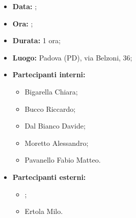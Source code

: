 \begin{itemize}
	\item \textbf{Data:} ;
	\item \textbf{Ora:} ;
	\item \textbf{Durata:} 1 ora;
	\item \textbf{Luogo:} Padova (PD), via Belzoni, 36;
	\item \textbf{Partecipanti interni:}
	\begin{itemize}
		\item Bigarella Chiara;
		\item Bucco Riccardo;
		\item Dal Bianco Davide;
		\item Moretto Alessandro;
		\item Pavanello Fabio Matteo.
	\end{itemize}
	\item \textbf{Partecipanti esterni:}
	\begin{itemize}
		\item \proponente;
		\item Ertola Milo.
	\end{itemize}
\end{itemize}
\newpage
